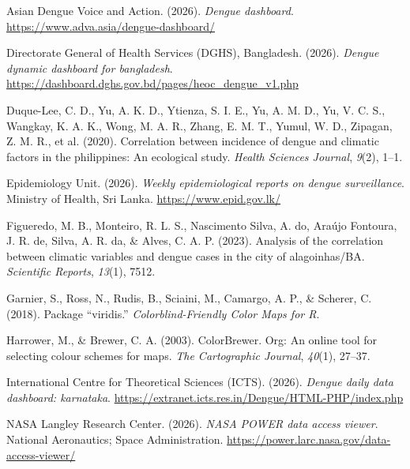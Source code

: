 \documentclass[
]{article}
\newlength{\cslhangindent}
\newenvironment{CSLReferences}[2] %
 {\begin{list}{}{%
  \setlength{\itemindent}{0pt}
  \setlength{\leftmargin}{0pt}
  \setlength{\parsep}{0pt}
  \ifodd #1
   \setlength{\leftmargin}{\cslhangindent}
   \setlength{\itemindent}{-1\cslhangindent}
  \fi
  \setlength{\itemsep}{#2\baselineskip}}}
 {\end{list}}
\begin{document}
\protect{}\label{refs}
\begin{CSLReferences}{1}{0}
Asian Dengue Voice and Action. (2026). \emph{Dengue dashboard}.
\url{https://www.adva.asia/dengue-dashboard/}

Directorate General of Health Services (DGHS), Bangladesh. (2026).
\emph{Dengue dynamic dashboard for bangladesh}.
\url{https://dashboard.dghs.gov.bd/pages/heoc_dengue_v1.php}

{Duque-Lee, C. D., Yu, A. K. D., Ytienza, S. I. E., Yu, A. M. D., Yu, V.
C. S., Wangkay, K. A. K., Wong, M. A. R., Zhang, E. M. T., Yumul, W. D.,
Zipagan, Z. M. R., et al.} (2020). Correlation between incidence of
dengue and climatic factors in the philippines: An ecological study.
\emph{Health Sciences Journal}, \emph{9}(2), 1--1.

Epidemiology Unit. (2026). \emph{Weekly epidemiological reports on
dengue surveillance}. Ministry of Health, Sri Lanka.
\url{https://www.epid.gov.lk/}

Figueredo, M. B., Monteiro, R. L. S., Nascimento Silva, A. do, Araújo
Fontoura, J. R. de, Silva, A. R. da, \& Alves, C. A. P. (2023). Analysis
of the correlation between climatic variables and dengue cases in the
city of alagoinhas/BA. \emph{Scientific Reports}, \emph{13}(1), 7512.

Garnier, S., Ross, N., Rudis, B., Sciaini, M., Camargo, A. P., \&
Scherer, C. (2018). Package {``viridis.''} \emph{Colorblind-Friendly
Color Maps for R}.

Harrower, M., \& Brewer, C. A. (2003). ColorBrewer. Org: An online tool
for selecting colour schemes for maps. \emph{The Cartographic Journal},
\emph{40}(1), 27--37.

International Centre for Theoretical Sciences (ICTS). (2026).
\emph{Dengue daily data dashboard: karnataka}.
\url{https://extranet.icts.res.in/Dengue/HTML-PHP/index.php}

NASA Langley Research Center. (2026). \emph{NASA POWER data access
viewer}. National Aeronautics; Space Administration.
\url{https://power.larc.nasa.gov/data-access-viewer/}


\end{CSLReferences}
\end{document}
